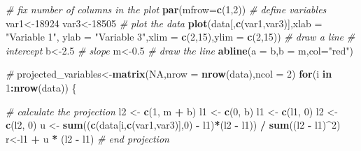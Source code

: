 \documentclass[
]{book}
\newenvironment{Shaded}{\begin{snugshade}}{\end{snugshade}}
\newcommand{\CommentTok}[1]{\textcolor[rgb]{0.56,0.35,0.01}{\textit{#1}}}
\newcommand{\ControlFlowTok}[1]{\textcolor[rgb]{0.13,0.29,0.53}{\textbf{#1}}}
\newcommand{\DataTypeTok}[1]{\textcolor[rgb]{0.13,0.29,0.53}{#1}}
\newcommand{\DecValTok}[1]{\textcolor[rgb]{0.00,0.00,0.81}{#1}}
\newcommand{\FloatTok}[1]{\textcolor[rgb]{0.00,0.00,0.81}{#1}}
\newcommand{\KeywordTok}[1]{\textcolor[rgb]{0.13,0.29,0.53}{\textbf{#1}}}
\newcommand{\NormalTok}[1]{#1}
\newcommand{\OperatorTok}[1]{\textcolor[rgb]{0.81,0.36,0.00}{\textbf{#1}}}
\newcommand{\OtherTok}[1]{\textcolor[rgb]{0.56,0.35,0.01}{#1}}
\newcommand{\StringTok}[1]{\textcolor[rgb]{0.31,0.60,0.02}{#1}}
\theoremstyle{definition}
\theoremstyle{definition}
\theoremstyle{definition}
\theoremstyle{remark}
\begin{document}
\begin{Shaded}
\begin{Highlighting}[]
\CommentTok{# fix number of columns in the plot}
\KeywordTok{par}\NormalTok{(}\DataTypeTok{mfrow=}\KeywordTok{c}\NormalTok{(}\DecValTok{1}\NormalTok{,}\DecValTok{2}\NormalTok{))}
\CommentTok{# define variables}
\NormalTok{var1<-}\DecValTok{18924}
\NormalTok{var3<-}\DecValTok{18505}
\CommentTok{# plot the data}
\KeywordTok{plot}\NormalTok{(data[,}\KeywordTok{c}\NormalTok{(var1,var3)],}\DataTypeTok{xlab =} \StringTok{"Variable 1"}\NormalTok{, }\DataTypeTok{ylab =} \StringTok{"Variable 3"}\NormalTok{,}\DataTypeTok{xlim =} \KeywordTok{c}\NormalTok{(}\DecValTok{2}\NormalTok{,}\DecValTok{15}\NormalTok{),}\DataTypeTok{ylim =} \KeywordTok{c}\NormalTok{(}\DecValTok{2}\NormalTok{,}\DecValTok{15}\NormalTok{))}
\CommentTok{# draw a line}
\CommentTok{# intercept}
\NormalTok{b<-}\FloatTok{2.5}
\CommentTok{# slope}
\NormalTok{m<-}\FloatTok{0.5}
\CommentTok{# draw the line}
\KeywordTok{abline}\NormalTok{(}\DataTypeTok{a =}\NormalTok{ b,}\DataTypeTok{b =}\NormalTok{ m,}\DataTypeTok{col=}\StringTok{"red"}\NormalTok{)}

\CommentTok{#}
\NormalTok{projected_variables<-}\KeywordTok{matrix}\NormalTok{(}\OtherTok{NA}\NormalTok{,}\DataTypeTok{nrow =} \KeywordTok{nrow}\NormalTok{(data),}\DataTypeTok{ncol =} \DecValTok{2}\NormalTok{)}
\ControlFlowTok{for}\NormalTok{(i }\ControlFlowTok{in} \DecValTok{1}\OperatorTok{:}\KeywordTok{nrow}\NormalTok{(data))}
\NormalTok{\{}

\CommentTok{# calculate the projection}
\NormalTok{l2 <-}\StringTok{ }\KeywordTok{c}\NormalTok{(}\DecValTok{1}\NormalTok{, m }\OperatorTok{+}\StringTok{ }\NormalTok{b)}
\NormalTok{l1 <-}\StringTok{ }\KeywordTok{c}\NormalTok{(}\DecValTok{0}\NormalTok{, b)}
\NormalTok{l1 <-}\StringTok{ }\KeywordTok{c}\NormalTok{(l1, }\DecValTok{0}\NormalTok{)}
\NormalTok{l2 <-}\StringTok{ }\KeywordTok{c}\NormalTok{(l2, }\DecValTok{0}\NormalTok{)}
\NormalTok{u <-}\StringTok{ }\KeywordTok{sum}\NormalTok{((}\KeywordTok{c}\NormalTok{(data[i,}\KeywordTok{c}\NormalTok{(var1,var3)],}\DecValTok{0}\NormalTok{) }\OperatorTok{-}\StringTok{ }\NormalTok{l1)}\OperatorTok{*}\NormalTok{(l2 }\OperatorTok{-}\StringTok{ }\NormalTok{l1)) }\OperatorTok{/}\StringTok{ }\KeywordTok{sum}\NormalTok{((l2 }\OperatorTok{-}\StringTok{ }\NormalTok{l1)}\OperatorTok{^}\DecValTok{2}\NormalTok{)}
\NormalTok{r<-l1 }\OperatorTok{+}\StringTok{ }\NormalTok{u }\OperatorTok{*}\StringTok{ }\NormalTok{(l2 }\OperatorTok{-}\StringTok{ }\NormalTok{l1)}
\CommentTok{# end projection}


\end{Highlighting}
\end{Shaded}
\end{document}

